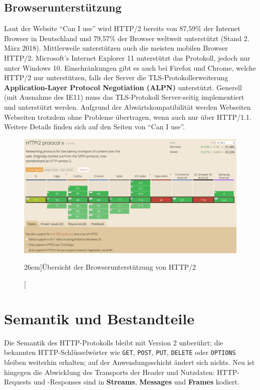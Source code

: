 \documentclass[a4paper, justified, notoc]{tufte-handout} %
\begin{document}
\subsection{Browserunterstützung} %
\label{sub:browserunterstutzung}
Laut der Website ``Can I use'' wird HTTP/2 bereits von 87,59\% der Internet Browser in Deutschland und 79,57\% der Browser weltweit unterstützt (Stand 2. März 2018). 
Mittlerweile unterstützen auch die meisten mobilen Browser HTTP/2. 
Microsoft's Internet Explorer 11 unterstützt das Protokoll, jedoch nur unter Windows 10.
Einschränkungen gibt es auch bei Firefox und Chrome, welche HTTP/2 nur unterstützen, falls der Server die TLS-Protokollerweiterung \textbf{Application-Layer Protocol Negotiation (ALPN)} unterstützt.
Generell (mit Ausnahme des IE11) muss das TLS-Protokoll Server-seitig implementiert und unterstützt werden.
Aufgrund der Abwärtskompatibilität werden Webseiten Webseiten trotzdem ohne Probleme übertragen, wenn auch nur über HTTP/1.1.
Weitere Details finden sich auf den Seiten von ``Can I use''. %

\begin{figure}%
	\centering
  \includegraphics[width=1.55\textwidth]{./figures/http2_browser_support.png}
  \caption[][26em]{Übersicht der Browserunterstützung von HTTP/2}
  \label{fig:http2_browser_support}
\end{figure}


 

\section{Semantik und Bestandteile} %
\label{sub:semantik_und_bestandteile}
Die Semantik des HTTP-Protokolls bleibt mit Version 2 unberührt; die bekannten HTTP-Schlüsselwörter wie \texttt{GET}, \texttt{POST}, \texttt{PUT}, \texttt{DELETE} oder \texttt{OPTIONS} bleiben weiterhin erhalten; auf der Anwendungsschicht ändert sich nichts. Neu ist hingegen die Abwicklung des Transports der Header und Nutzdaten: HTTP-Requests und -Responses sind in \textbf{Streams}, \textbf{Messages} und \textbf{Frames} kodiert. %
\end{document}
